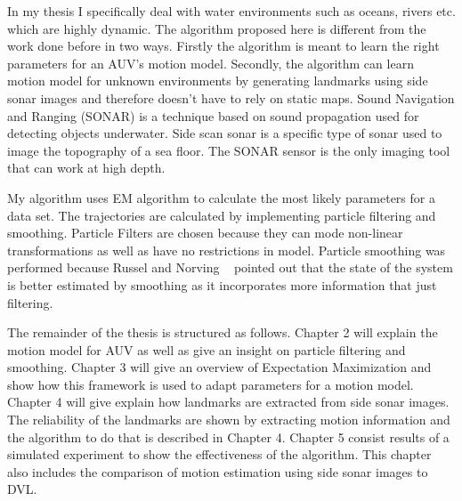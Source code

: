\documentclass[12pt,draft]{dalcsthesis}
\begin{document}
In my thesis I specifically deal with water environments such as oceans, rivers etc. which are highly dynamic.  The algorithm proposed here is different from the work done before in two ways. Firstly the algorithm is meant to learn the right parameters for an AUV's motion model. Secondly, the algorithm can learn motion model for unknown environments by generating landmarks using side sonar images and therefore doesn't have to rely on static maps. Sound Navigation and Ranging (SONAR) is a technique based on sound propagation used for detecting objects underwater. Side scan sonar is a specific type of sonar used to image the topography of a sea floor.  The SONAR sensor is the only imaging tool that can work at high depth. 

My algorithm uses EM algorithm to calculate the most likely parameters for a data set.  The trajectories are calculated by implementing particle filtering and smoothing.  Particle Filters are chosen because they can mode non-linear transformations as well as have no restrictions in model. Particle smoothing was performed because Russel and Norving ~\cite{russell2003artificial} pointed out that the state of the system is better estimated by smoothing as it incorporates more information that just filtering. 

The remainder of the thesis is structured as follows. Chapter 2 will explain the motion model for AUV as well as give an insight on particle filtering and smoothing. Chapter 3 will give an overview of Expectation Maximization and show how this framework is used to adapt parameters for a motion model. Chapter 4 will give explain how landmarks are extracted from side sonar images. The reliability of the landmarks are shown by extracting motion information and the algorithm to do that is described in Chapter 4. Chapter 5 consist results of a simulated experiment to show the effectiveness of the algorithm. This chapter also includes the comparison of motion estimation using side sonar images to DVL.
 
\end{document}
